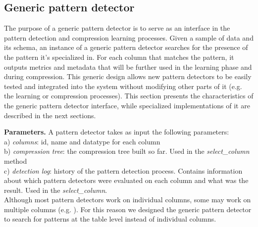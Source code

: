 \subsection{Generic pattern detector}
\label{subsec:genericpd}





% 

The purpose of a generic pattern detector is to serve as an interface in the pattern detection and compression learning processes. Given a sample of data and its schema, an instance of a generic pattern detector searches for the presence of the pattern it's specialized in.  For each column that matches the pattern, it outputs metrics and metadata that will be further used in the learning phase and during compression. This generic design allows new pattern detectors to be easily tested and integrated into the system without modifying other parts of it (e.g. the learning or compression processes). This section presents the characteristics of the generic pattern detector interface, while specialized implementations of it are described in the next sections.

\textbf{Parameters.} A pattern detector takes as input the following parameters:\\
a) \textit{columns}: id, name and datatype for each column\\
b) \textit{compression tree}: the compression tree built so far. Used in the \textit{select\_column} method\\
c) \textit{detection log}: history of the pattern detection process. Contains information about which pattern detectors were evaluated on each column and what was the result. Used in the \textit{select\_column}.\\
Although most pattern detectors work on individual columns, some may work on multiple columns (e.g. ). For this reason we designed the generic pattern detector to search for patterns at the table level instead of individual columns.

